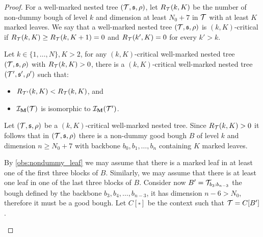 \begin{proof}
For a well-marked nested tree $(\t, \spt, \marking)$, let $R_{\t}(k,K)$ be the number of non-dummy bough of level $k$ and dimension at least $N_0+7$ in $\t$ with at least $K$ marked leaves. 
We say that a well-marked nested tree $(\t, \spt, \marking)$ is $(k,K)$-critical if $R_{\t}(k,K)\geq R_{\t}(k,K+1)=0$ and $R_{\t}(k',K) = 0$ for every $k'>k$.

\begin{claim} \label{clm:iteration_marked}  
Let $k\in \{1,\dots, N\}, K > 2$, for any $(k,K)$-critical well-marked nested tree $(\t, \spt, \marking)$ with $R_{\t}(k,K)>0$, there is a  $(k,K)$-critical well-marked nested tree $(\t', \spt', \marking')$ such that:
\begin{itemize}
  \item $R_{\t'}(k,K) < R_{\t}(k,K)$, and
  \item $\someInterp_{\marked}(\t)$ is isomorphic to $\someInterp_{\marked}(\t')$.
\end{itemize}
\end{claim}

\begin{claimproof}
  Let $(\t, \spt, \marking)$ be a $(k,K)$-critical well-marked nested tree.
  Since $R_{\t}(k,K)>  0$ it follows that in $(\t, \spt, \marking)$ 
  there is a non-dummy good bough $B$ of level $k$ and dimension $n\geq N_0+7$ with backbone $b_0,b_1,\dots, b_n$ containing $K$ marked leaves. 

  By \cref{obs:nondummy_leaf} we may assume that there is a marked leaf in at least one of the first three blocks  of $B$.
  Similarly, we may assume that there is at least one leaf in one of the last three blocks of $B$.
  Consider now $B' = \BBlock[\t]{b_3}{b_{n-3}}$ the bough defined by the backbone $b_3,b_4,\dots, b_{n-3}$, it has dimension $n-6> N_0 $, therefore it must be a good bough. Let $C[\square]$ be the context such that $\t = C[B']$.


\end{claimproof}
\end{proof}
